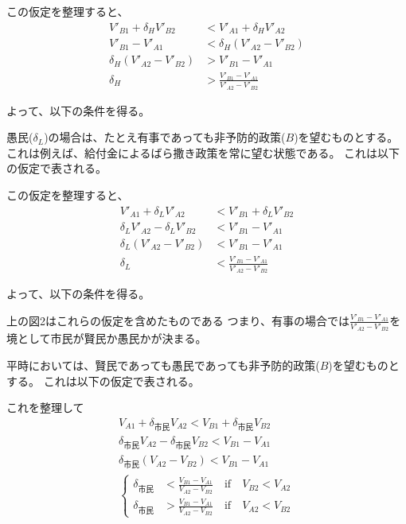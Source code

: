 \documentclass[main.tex]{subfiles}
\begin{document}
この仮定を整理すると、
\begin{align*}
  V'_{B1} + \delta_H V'_{B2} &< V'_{A1} + \delta_H V'_{A2}\\
  V'_{B1}-V'_{A1}  &<  \delta_H (V'_{A2} - V'_{B2}) \\
  \delta_H (V'_{A2} - V'_{B2}) &> V'_{B1}-V'_{A1} \\
  \delta_H &> \frac{V'_{B1}-V'_{A1}}{V'_{A2} - V'_{B2}}
\end{align*}

よって、以下の条件を得る。






\bigskip
愚民($\delta_L$)の場合は、たとえ有事であっても非予防的政策($B$)を望むものとする。これは例えば、給付金によるばら撒き政策を常に望む状態である。
これは以下の仮定で表される。
 
この仮定を整理すると、
\begin{align*}
  V'_{A1} + \delta_L V'_{A2} &< V'_{B1} + \delta_L V'_{B2} \\
  \delta_L V'_{A2} - \delta_L V'_{B2} &< V'_{B1}  - V'_{A1} \\
  \delta_L (V'_{A2} - V'_{B2}) &< V'_{B1}  - V'_{A1}\\
  \delta_L &< \frac{V'_{B1}  - V'_{A1}}{V'_{A2} - V'_{B2}}
\end{align*}

よって、以下の条件を得る。

\bigskip
上の図2はこれらの仮定を含めたものである%
つまり、有事の場合では$\frac{V'_{B1} - V'_{A1}}{V'_{A2} - V'_{B2}}$を境として市民が賢民か愚民かが決まる。 


平時においては、賢民であっても愚民であっても非予防的政策($B$)を望むものとする。
これは以下の仮定で表される。

これを整理して
\begin{align*}
  V_{A1} + \delta_{市民} V_{A2} < V_{B1} + \delta_{市民} V_{B2} \\
  \delta_{市民} V_{A2} - \delta_{市民} V_{B2} < V_{B1} - V_{A1} \\
  \delta_{市民} (V_{A2} - V_{B2}) < V_{B1} - V_{A1} \\
  \begin{cases}
    \delta_{市民} &< \frac{V_{B1}-V_{A1}}{V_{A2} - V_{B2}} \quad\text{if}\quad V_{B2} < V_{A2}\\
    \delta_{市民} &> \frac{V_{B1}-V_{A1}}{V_{A2} - V_{B2}} \quad\text{if}\quad V_{A2} < V_{B2}
  \end{cases}
\end{align*}
\end{document}
